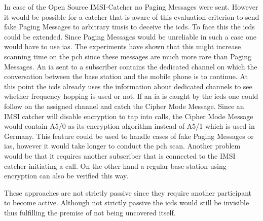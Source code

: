 In case of the Open Source IMSI-Catcher no Paging Messages were sent.
However it would be possible for a catcher that is aware of this evaluation criterion to send fake Paging Messages to arbitrary \glspl{tmsi} to deceive the \gls{icds}.
To face this the \gls{icds} could be extended.
Since Paging Messages would be unreliable in such a case one would have to use \glspl{ia}.
The experiments have shown that this might increase scanning time on the \gls{pch} since these messages are much more rare than Paging Messages.
An \gls{ia} sent to a subscriber contains the dedicated channel on which the conversation between the base station and the mobile phone is to continue.
At this point the \gls{icds} already uses the information about dedicated channels to see whether frequency hopping is used or not.
If an \gls{ia} is caught by the \gls{icds} one could follow on the assigned channel and catch the Cipher Mode Message.
Since an IMSI catcher will disable encryption to tap into calls, the Cipher Mode Message would contain A5/0 as its encryption algorithm instead of A5/1 which is used in Germany.
This feature could be used to handle cases of fake Paging Messages or \glspl{ia}, however it would take longer to conduct the \gls{pch} scan.
Another problem would be that it requires another subscriber that is connected to the IMSI catcher initiating a call.
On the other hand a regular base station using encryption can also be verified this way.

These approaches are not strictly passive since they require another participant to become active.
Although not strictly passive the \gls{icds} would still be invisible thus fulfilling the premise of not being uncovered itself.

